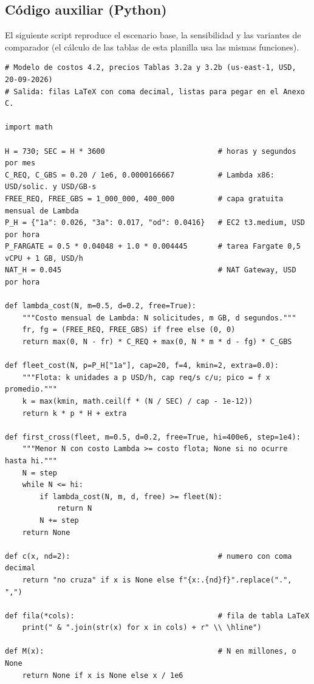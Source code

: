 \documentclass[12pt, letterpaper, table, xcdraw]{inf-pucv}
\begin{document}
\subsection*{Código auxiliar (Python)}

El siguiente script reproduce el escenario base, la sensibilidad y las variantes de comparador (el cálculo de las tablas de esta planilla usa las mismas funciones).

{\scriptsize
\begin{verbatim}
# Modelo de costos 4.2, precios Tablas 3.2a y 3.2b (us-east-1, USD, 20-09-2026)
# Salida: filas LaTeX con coma decimal, listas para pegar en el Anexo C.

import math

H = 730; SEC = H * 3600                          # horas y segundos por mes
C_REQ, C_GBS = 0.20 / 1e6, 0.0000166667          # Lambda x86: USD/solic. y USD/GB-s
FREE_REQ, FREE_GBS = 1_000_000, 400_000          # capa gratuita mensual de Lambda
P_H = {"1a": 0.026, "3a": 0.017, "od": 0.0416}   # EC2 t3.medium, USD por hora
P_FARGATE = 0.5 * 0.04048 + 1.0 * 0.004445       # tarea Fargate 0,5 vCPU + 1 GB, USD/h
NAT_H = 0.045                                    # NAT Gateway, USD por hora

def lambda_cost(N, m=0.5, d=0.2, free=True):
    """Costo mensual de Lambda: N solicitudes, m GB, d segundos."""
    fr, fg = (FREE_REQ, FREE_GBS) if free else (0, 0)
    return max(0, N - fr) * C_REQ + max(0, N * m * d - fg) * C_GBS

def fleet_cost(N, p=P_H["1a"], cap=20, f=4, kmin=2, extra=0.0):
    """Flota: k unidades a p USD/h, cap req/s c/u; pico = f x promedio."""
    k = max(kmin, math.ceil(f * (N / SEC) / cap - 1e-12))
    return k * p * H + extra

def first_cross(fleet, m=0.5, d=0.2, free=True, hi=400e6, step=1e4):
    """Menor N con costo Lambda >= costo flota; None si no ocurre hasta hi."""
    N = step
    while N <= hi:
        if lambda_cost(N, m, d, free) >= fleet(N):
            return N
        N += step
    return None

def c(x, nd=2):                                  # numero con coma decimal
    return "no cruza" if x is None else f"{x:.{nd}f}".replace(".", ",")

def fila(*cols):                                 # fila de tabla LaTeX
    print(" & ".join(str(x) for x in cols) + r" \\ \hline")

def M(x):                                        # N en millones, o None
    return None if x is None else x / 1e6


\end{verbatim}}
\end{document}
